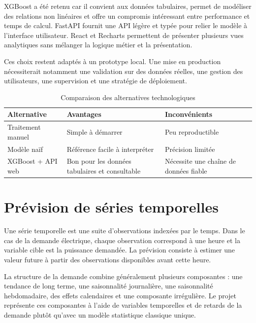 \documentclass[12pt,a4paper]{report}
\begin{document}
XGBoost a été retenu car il convient aux données tabulaires, permet de
modéliser des relations non linéaires et offre un compromis intéressant entre
performance et temps de calcul. FastAPI fournit une API légère et typée pour
relier le modèle à l'interface utilisateur. React et Recharts permettent de
présenter plusieurs vues analytiques sans mélanger la logique métier et la
présentation.

Ces choix restent adaptés à un prototype local. Une mise en production
nécessiterait notamment une validation sur des données réelles, une gestion
des utilisateurs, une supervision et une stratégie de déploiement.

\begin{table}[htbp]
	\centering
	\caption{Comparaison des alternatives technologiques}
	\label{tab:comparaison-technologies}
	\begin{tabular}{p{} p{} p{}}
		\toprule
		Alternative & Avantages & Inconvénients \\
		\midrule
		Traitement manuel & Simple à démarrer & Peu reproductible \\
		Modèle naïf & Référence facile à interpréter & Précision limitée \\
		XGBoost + API web & Bon pour les données tabulaires et consultable & Nécessite une chaîne de données fiable \\
		\bottomrule
	\end{tabular}
\end{table}


\section{Prévision de séries temporelles}

Une série temporelle est une suite d'observations indexées par le temps. Dans
le cas de la demande électrique, chaque observation correspond à une heure et
la variable cible est la puissance demandée. La prévision consiste à estimer
une valeur future à partir des observations disponibles avant cette heure.

La structure de la demande combine généralement plusieurs composantes : une
tendance de long terme, une saisonnalité journalière, une saisonnalité
hebdomadaire, des effets calendaires et une composante irrégulière. Le projet
représente ces composantes à l'aide de variables temporelles et de retards de
la demande plutôt qu'avec un modèle statistique classique unique.
\end{document}
